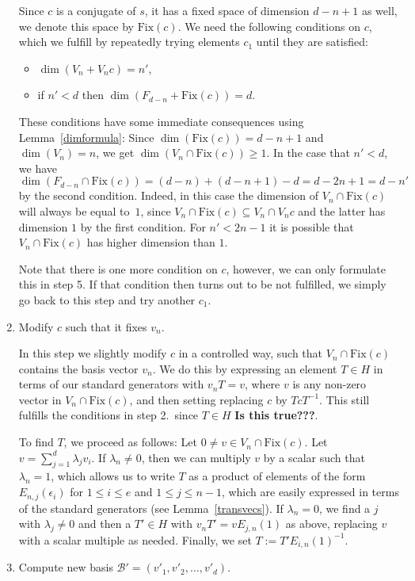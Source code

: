 \documentclass[a4paper,11pt]{article}
\newcommand{\Fix}[1]{\mathrm{Fix}(#1)}
\newcommand{\fixme}[1]{\textbf{#1}}
\newcommand{\B}{\mathcal{B}}
\begin{document}
\begin{enumerate}
Since $c$ is a conjugate of $s$,
it has a fixed space of dimension $d-n+1$ as well, we denote this space
by $\Fix c$. We need the following
conditions on $c$, which we fulfill by repeatedly trying elements $c_1$
until they are satisfied:
\begin{itemize}
\item $\dim(V_n + V_n c) = n'$,
\item if $n' < d$ then $\dim(F_{d-n} + \Fix c) = d$.
\end{itemize}
These conditions have some immediate consequences using
Lemma~\ref{dimformula}: Since $\dim(\Fix c) =
d-n+1$ and $\dim(V_n) = n$, we get $\dim(V_n \cap \Fix c) \ge
1$. In the case that $n' < d$, we have
$\dim(F_{d-n} \cap \Fix c) = (d-n) + (d-n+1) - d = d-2n+1 = d-n'$ by 
the second condition. Indeed, in this
case the dimension of $V_n \cap \Fix c$
will always be equal to~$1$, since $V_n \cap \Fix c \subseteq V_n \cap V_n
c$ and the latter has dimension $1$ by the first condition.
For $n' < 2n-1$ it is possible that $V_n \cap \Fix c$ has higher 
dimension than $1$.

Note that there is one more condition on $c$, however, we can only
formulate this in step 5. If that condition then turns out to be not fulfilled,
we simply go back to this step and try another $c_1$.

\item Modify $c$ such that it fixes $v_n$.

In this step we slightly modify $c$ in a controlled way, such that
$V_n \cap \Fix c$ contains the basis vector $v_n$. We do this by expressing
an element $T \in H$ in terms of our standard generators with $v_nT
= v$, where $v$ is any non-zero vector in $V_n \cap \Fix c$,
and then setting replacing $c$ by $Tc T^{-1}$. This still fulfills
the conditions in step 2.~since $T \in H$ \fixme{Is this true???}.

To find $T$, we proceed as follows: Let $0 \neq v \in V_n \cap \Fix c$.
Let $v = \sum_{j=1}^d \lambda_j v_i$. If $\lambda_n \neq 0$, 
then we can multiply $v$ by a scalar such that
$\lambda_n = 1$, which allows us to write $T$ as a product of
elements of the form $E_{n,j}(\epsilon_i)$ for $1 \le i \le e$
and $1 \le j \le n-1$, which are easily expressed in terms of the
standard generators (see Lemma~\ref{transvecs}).
If $\lambda_n = 0$, we find a $j$ with $\lambda_j \neq 0$ and
then a $T' \in H$ with $v_n T' = vE_{j,n}(1)$ as above,
replacing $v$ with a scalar multiple as needed. Finally, we set
$T := T' E_{i,n}(1)^{-1}$.
\item Compute new basis $\B' = (v'_1,v'_2,\ldots,v'_d)$.


\end{enumerate}
\end{document}
